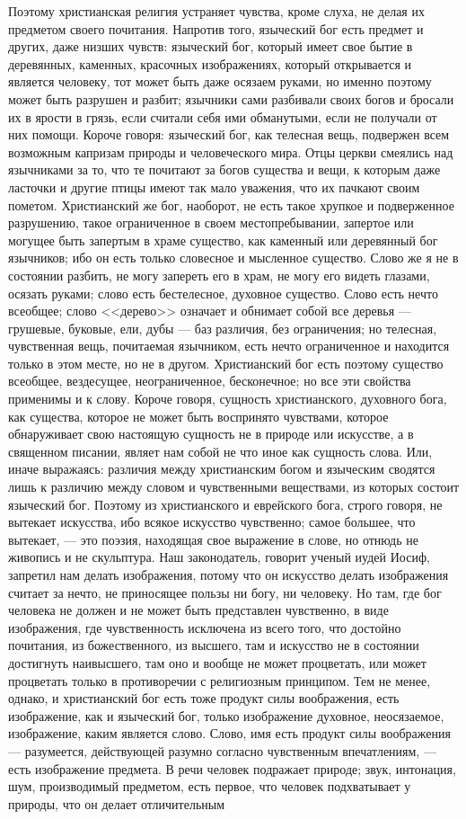 \documentclass[12pt]{article}
\begin{document}
Поэтому христианская религия устраняет чувства, кроме слуха, не делая их предметом своего почитания. Напротив того, языческий бог есть предмет и других, даже низших чувств: языческий бог, который имеет свое бытие в деревянных, каменных, красочных изображениях, который открывается и является человеку, тот может быть даже осязаем руками, но именно поэтому может быть разрушен и разбит; язычники сами разбивали своих богов и бросали их в ярости в грязь, если считали себя ими обманутыми, если не получали от них помощи. Короче говоря: языческий бог, как телесная вещь, подвержен всем возможным капризам природы и человеческого мира. Отцы церкви смеялись над язычниками за то, что те почитают за богов существа и вещи, к которым даже ласточки и другие птицы имеют так мало уважения, что их пачкают своим пометом. Христианский же бог, наоборот, не есть такое хрупкое и подверженное разрушению, такое ограниченное в своем местопребывании, запертое или могущее быть запертым в храме существо, как каменный или деревянный бог язычников; ибо он есть только словесное и мысленное существо. Слово же я не в состоянии разбить, не могу запереть его в храм, не могу его видеть глазами, осязать руками; слово есть бестелесное, духовное существо. Слово есть нечто всеобщее; слово <<дерево>> означает и обнимает собой все деревья --- грушевые, буковые, ели, дубы --- баз различия, без ограничения; но телесная, чувственная вещь, почитаемая язычником, есть нечто ограниченное и находится только в этом месте, но не в другом. Христианский бог есть поэтому существо всеобщее, вездесущее, неограниченное, бесконечное; но все эти свойства применимы и к слову. Короче говоря, сущность христианского, духовного бога, как существа, которое не может быть воспринято чувствами, которое обнаруживает свою настоящую сущность не в природе или искусстве, а в священном писании, являет нам собой не что иное как сущность слова. Или, иначе выражаясь: различия между христианским богом и языческим сводятся лишь к различию между словом и чувственными веществами, из которых состоит языческий бог. Поэтому из христианского и еврейского бога, строго говоря, не вытекает искусства, ибо всякое искусство чувственно; самое большее, что вытекает, --- это поэзия, находящая свое выражение в слове, но отнюдь не живопись и не скульптура. Наш законодатель, говорит ученый иудей Иосиф, запретил нам делать изображения, потому что он искусство делать изображения считает за нечто, не приносящее пользы ни богу, ни человеку. Но там, где бог человека не должен и не может быть представлен чувственно, в виде изображения, где чувственность исключена из всего того, что достойно почитания, из божественного, из высшего, там и искусство не в состоянии достигнуть наивысшего, там оно и вообще не может процветать, или может процветать только в противоречии с религиозным принципом. Тем не менее, однако, и христианский бог есть тоже продукт силы воображения, есть изображение, как и языческий бог, только изображение духовное, неосязаемое, изображение, каким является слово. Слово, имя есть продукт силы воображения --- разумеется, действующей разумно согласно чувственным впечатлениям, --- есть изображение предмета. В речи человек подражает природе; звук, интонация, шум, производимый предметом, есть первое, что человек подхватывает у природы, что он делает отличительным 
\end{document}
